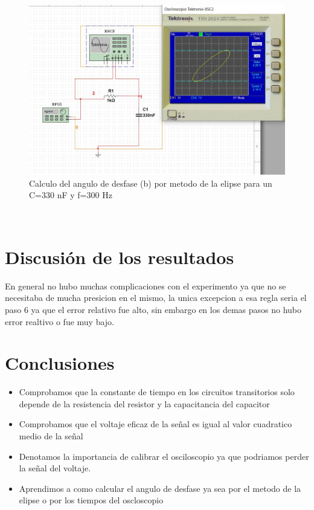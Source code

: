 \documentclass[twoside,twocolumn]{article}
\begin{document}
  \begin{figure}[h]
    \centering
    \includegraphics[scale=0.2]{Imagenes/5.6.JPG}
    \caption{Calculo del angulo de desfase (b) por metodo de la elipse para un C=330 nF y f=300 Hz}
    \label{fig:circuito1}
  \end{figure}\\  

\section{Discusión de los resultados} 

En general no hubo muchas complicaciones con el experimento ya que no se necesitaba de mucha presicion en el mismo, la unica excepcion a esa regla seria el paso 6 ya que el error relativo fue alto, sin embargo en los demas pasos no hubo error realtivo o fue muy bajo.

\section{Conclusiones}

\begin{itemize}

\item Comprobamos que la constante de tiempo en los circuitos transitorios solo depende de la resistencia del resistor y la capacitancia del capacitor

\item Comprobamos que el voltaje eficaz de la señal es igual al valor cuadratico medio de la señal

\item Denotamos la importancia de calibrar el osciloscopio ya que podriamos perder la señal del voltaje.

\item Aprendimos a como calcular el angulo de desfase ya sea por el metodo de la elipse o por los tiempos del oscloscopio

\end{itemize}
\end{document}
